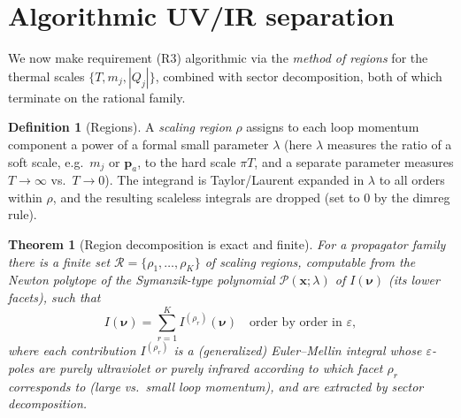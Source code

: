 \documentclass{amsart}
\newtheorem{theorem}{Theorem}
\theoremstyle{definition}
\newtheorem{definition}{Definition}
\begin{document}
\section{Algorithmic UV/IR separation}

We now make requirement (R3) algorithmic via the \emph{method of regions} for
the thermal scales $\{T, m_j, |Q_j|\}$, combined with sector decomposition,
both of which terminate on the rational family.

\begin{definition}[Regions]
A \emph{scaling region} $\rho$ assigns to each loop momentum component a power
of a formal small parameter $\lambda$ (here $\lambda$ measures the ratio of a
soft scale, e.g.\ $m_j$ or $\mathbf p_a$, to the hard scale $\pi T$, and a
separate parameter measures $T\to\infty$ vs.\ $T\to0$). The integrand is
Taylor/Laurent expanded in $\lambda$ to all orders within $\rho$, and the
resulting scaleless integrals are dropped (set to $0$ by the dimreg rule).
\end{definition}

\begin{theorem}[Region decomposition is exact and finite]\label{thm:regions}
For a propagator family there is a \emph{finite} set
$\mathcal R=\{\rho_1,\dots,\rho_K\}$ of scaling regions, computable from the
Newton polytope of the Symanzik-type polynomial
$\mathcal P(\boldsymbol x;\lambda)$ of $I(\boldsymbol\nu)$ (its lower facets),
such that
\begin{equation}\label{eq:regions}
  I(\boldsymbol\nu) = \sum_{r=1}^{K} I^{(\rho_r)}(\boldsymbol\nu)
  \quad\text{order by order in }\varepsilon,
\end{equation}
where each contribution $I^{(\rho_r)}$ is a (generalized) Euler--Mellin
integral whose $\varepsilon$-poles are \emph{purely ultraviolet} or
\emph{purely infrared} according to which facet $\rho_r$ corresponds to (large
vs.\ small loop momentum), and are extracted by sector decomposition.
\end{theorem}
\end{document}
